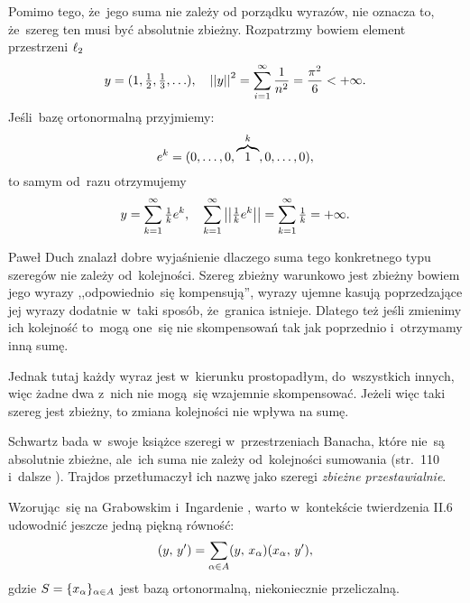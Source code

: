 \documentclass[a4paper,11pt]{article}
\begin{document}
Pomimo tego, że~jego suma nie zależy od porządku wyrazów, nie oznacza
to, że~szereg ten musi być absolutnie zbieżny. Rozpatrzmy bowiem
element przestrzeni $\ell_{ 2 }$
\begin{equation*}
  y = ( 1, \tfrac{ 1 }{ 2 }, \tfrac{ 1 }{ 3 },\ldots ), \quad
  \left|\left|  y  \right|\right|^{ 2 } = \sum\limits_{ i = 1 }^{ \infty } \frac{ 1 }{ n^{ 2 } }
  = \frac{ \pi^{ 2 } }{ 6 } < +\infty.
\end{equation*}
Jeśli~bazę ortonormalną przyjmiemy:
\begin{equation*}
  e^{ k } = ( 0, \ldots, 0, \overbrace{ 1 }^{ k }, 0, \ldots, 0),
\end{equation*}
to samym od~razu otrzymujemy
\begin{equation*}
  y = \sum\limits_{ k = 1 }^{ \infty } \tfrac{ 1 }{ k } e^{ k }, \quad
  \sum\limits_{ k = 1 }^{ \infty } \left|\left|  \tfrac{ 1 }{ k } e^{ k }  \right|\right|
  = \sum\limits_{ k = 1 }^{ \infty } \tfrac{ 1 }{ k } = +\infty.
\end{equation*}

Paweł Duch znalazł dobre wyjaśnienie dlaczego suma tego konkretnego
typu szeregów nie zależy od~kolejności. Szereg zbieżny warunkowo jest
zbieżny bowiem jego wyrazy ,,odpowiednio~się kompensują'', wyrazy
ujemne kasują poprzedzające jej wyrazy dodatnie w~taki sposób,
że~granica istnieje. Dlatego też jeśli zmienimy ich kolejność to~mogą
one~się nie skompensowań tak jak poprzednio i~otrzymamy inną sumę.

Jednak tutaj każdy wyraz jest w~kierunku prostopadłym, do~wszystkich
innych, więc żadne dwa z~nich nie mogą~się wzajemnie skompensować.
Jeżeli więc taki szereg jest zbieżny, to zmiana kolejności nie wpływa
na sumę.

Schwartz bada w~swoje książce szeregi w~przestrzeniach Banacha, które
nie~są absolutnie zbieżne, ale~ich suma nie zależy od~kolejności
sumowania (str.~110 i~dalsze \cite{SchwartzKursAnalizyMatematycznej79}). Trajdos przetłumaczył
ich nazwę jako szeregi \emph{zbieżne przestawialnie}. %

\vspace{\spaceFour}


\start {} Wzorując~się na Grabowskim i~Ingardenie
\cite{GrabowskiIngardenMechanikaKwantowa87}, warto w~kontekście
twierdzenia II.6 udowodnić jeszcze jedną piękną równość:
\begin{equation*}
  (  y , \,  y'  ) = \sum\limits_{ \alpha \in A } (  y , \,  x_{ \alpha }  )
  (  x_{ \alpha } , \,  y'  ),
\end{equation*}
gdzie $S = \{ x_{ \alpha } \}_{ \alpha \in A }$ jest bazą ortonormalną,
niekoniecznie przeliczalną.
\end{document}
